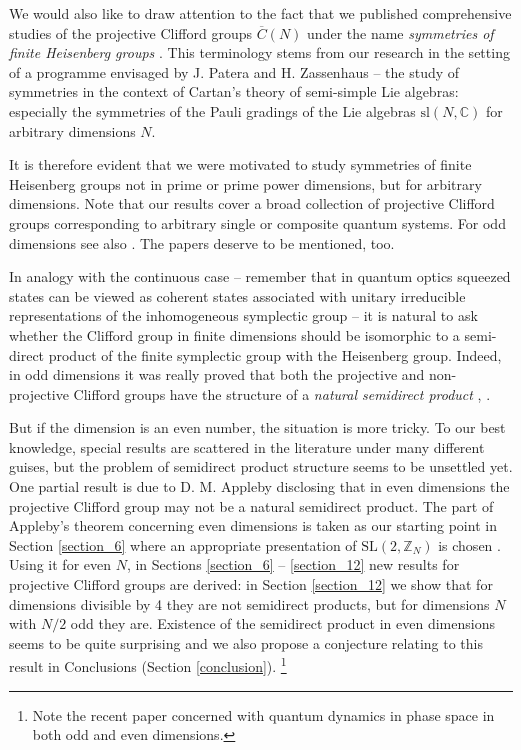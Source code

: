 \documentclass[10pt]{amsart}
\theoremstyle{plain}
\theoremstyle{definition}
\theoremstyle{remark}%
\newcommand{\Z}{\mathbb{Z}}
\newcommand{\C}{\mathbb{C}}
\newcommand{\SL}{\mathrm{SL}}
\begin{document}
We would also like to draw attention to the fact that we published 
comprehensive studies of the projective Clifford groups
 $\overline{C}(N)$ under the name \textit{symmetries of finite Heisenberg groups}
\cite{HPPT02, KorbTolar10, KorbTolar12}.
This terminology stems from our research in the setting of a
programme envisaged by J. Patera and H. Zassenhaus -- the study of symmetries 
in the context of Cartan's theory of semi-simple Lie algebras: 
especially the symmetries of the Pauli gradings of 
the Lie algebras $\mathrm{sl}(N,\C)$ \cite{HPP98, HPPT02, PZ88, PZ89}
for arbitrary dimensions $N$.

It is therefore evident that we were motivated to study symmetries 
of finite Heisenberg groups not in prime or prime power dimensions, 
but for arbitrary dimensions. Note that our results 
\cite{HPPT02, KorbTolar10, KorbTolar12} cover a broad collection 
of projective Clifford groups corresponding to arbitrary single
or composite quantum systems. For odd dimensions see also \cite{TolarJPCS18,TolarChadz}. 
The papers \cite{Digernes, DigernesVV, Hostens} deserve to be mentioned, too.



In analogy with the continuous case -- remember that in quantum optics
squeezed states can be viewed as coherent states associated with
unitary irreducible representations of the inhomogeneous symplectic group --
it is natural to ask whether the Clifford group in finite dimensions should be
isomorphic to a semi-direct product of the finite symplectic group
with the Heisenberg group. Indeed, in odd dimensions it was really proved 
that both the projective and non-projective Clifford groups
have the structure of a \textit{natural semidirect product} 
 \cite[Lemma 4]{Gross}, \cite{appleby,DuttaPrasad}. 
 
 
 
But if the dimension is an even number, the situation is more tricky.
To our best knowledge, special results are scattered in the literature
under many different guises, but the problem of semidirect product
structure seems to be unsettled yet. 
One partial result is due to D. M. Appleby \cite[Theorem 1]{appleby} 
disclosing that in even dimensions  the projective Clifford group 
may not be a natural semidirect product.
The part of Appleby's theorem \cite[Theorem 1]{appleby}  concerning even dimensions is taken
as our starting point in Section \ref{section_6}  where an appropriate 
presentation of $\SL(2,\Z_N)$ is chosen \cite{hopf}.
Using it for even $N$, in Sections \ref{section_6} -- \ref{section_12} new results 
for projective Clifford groups are derived: in Section \ref{section_12} we show
that for dimensions divisible by 4 they are not semidirect products,
but for dimensions $N$ with $N/2$ odd they are. Existence of the semidirect product in even dimensions seems to be quite surprising and we also propose a conjecture relating to this result in Conclusions (Section \ref{conclusion}). 
\footnote{Note the recent paper \cite{Raussendorf} concerned with
quantum dynamics in phase space in both odd and even dimensions.}
\end{document}
